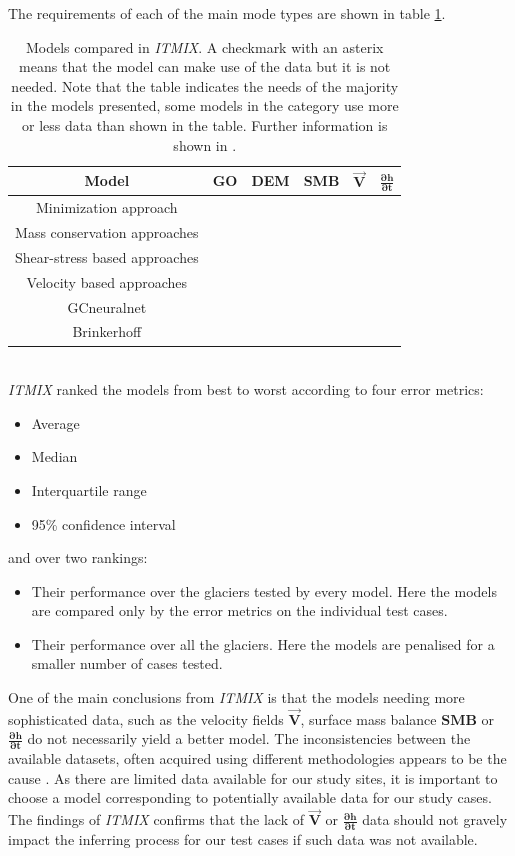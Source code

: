 \documentclass[a4, 12pt]{article}
\begin{document}
The requirements of each of the main mode types are shown in table \ref{tab:itmix_models}. 
\begin{table}[h!]
	\centering
	\caption{Models compared in \textit{ITMIX}. A checkmark with an asterix means that the model can make use of the data but it is not needed. Note that the table indicates the needs of the majority in the models presented, some models in the category use more or less data than shown in the table. Further information is shown in \citet{farinotti2016accurate}.} \label{tab:itmix_models}
	\begin{tabular}{|c|c|c|c|c|c|}
	\hline
	Model&\textbf{GO}&\textbf{DEM}&\textbf{SMB}&$\boldsymbol{\vec{V}}$&$\boldsymbol{\frac{\partial h}{\partial t}}$\\
	\hline
	Minimization approach & \checkmark & \checkmark & \checkmark & \checkmark * & \\
	\hline
	Mass conservation approaches & \checkmark & \checkmark & & & \\
	\hline
	Shear-stress based approaches & \checkmark & \checkmark & & & \\
	\hline
	Velocity based approaches & \checkmark & \checkmark & & \checkmark & \\
	\hline
	GCneuralnet & \checkmark & \checkmark & & & \\
	\hline
	Brinkerhoff & \checkmark & \checkmark & \checkmark & \checkmark & \checkmark \\
	\hline
	\end{tabular}
\end{table}
\\
\textit{ITMIX} ranked the models from best to worst according to four error metrics:
\begin{itemize}
\item Average \item Median \item Interquartile range \item 95\% confidence interval
\end{itemize}
and over two rankings:
\begin{itemize}
	\item Their performance over the glaciers tested by every model. Here the models are compared only by the error metrics on the individual test cases.
	\item Their performance over all the glaciers. Here the models are penalised for a smaller number of cases tested.
\end{itemize}
One of the main conclusions from \textit{ITMIX} is that the models needing more sophisticated data, such as the velocity fields $\boldsymbol{\vec{V}}$, surface mass balance $\boldsymbol{SMB}$ or $\boldsymbol{\frac{\partial h}{\partial t}}$ do not necessarily yield a better model. The inconsistencies between the available datasets, often acquired using different methodologies appears to be the cause \citep{farinotti2016accurate}. As there are limited data available for our study sites, it is important to choose a model corresponding to potentially available data for our study cases. The findings of \textit{ITMIX} confirms that the lack of $\boldsymbol{\vec{V}}$ or $\boldsymbol{\frac{\partial h}{\partial t}}$ data should not gravely impact the inferring process for our test cases if such data was not available.
\end{document}
